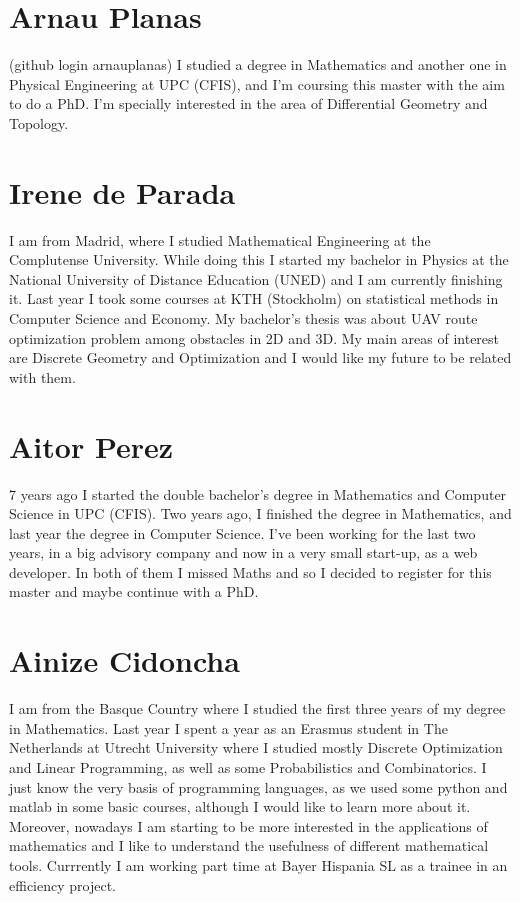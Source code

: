 \documentclass[11pt]{amsart}
\begin{document}
\section*{Arnau Planas}
(github login arnauplanas) I studied a degree in Mathematics and another one in Physical Engineering at UPC (CFIS), 
and I'm coursing this master with the aim to do a PhD. 
I'm specially interested in the area of Differential Geometry and Topology.
\medskip

\section*{Irene de Parada}

I am from Madrid, where I studied Mathematical Engineering at the Complutense University. While doing this I started my bachelor in Physics  at the National University of Distance Education (UNED) and I am currently finishing it. Last year I took some courses at KTH (Stockholm) on statistical methods in Computer Science and Economy. My  bachelor's thesis was about UAV route optimization problem  among obstacles in 2D and 3D. My main areas of interest are Discrete Geometry and Optimization and I would like my future to be related with them.

\section*{Aitor Perez}
7 years ago I started the double bachelor's degree in Mathematics and Computer Science in UPC (CFIS). Two years ago, I finished the degree in Mathematics, and last year the degree in Computer Science. I've been working for the last two years, in a big advisory company and now in a very small start-up, as a web developer. In both of them I missed Maths and so I decided to register for this master and maybe continue with a PhD.

\section*{Ainize Cidoncha}
I am from the Basque Country where I studied the first three years of my degree in Mathematics. Last year I spent a year as an Erasmus student in The Netherlands at Utrecht University where I studied mostly Discrete Optimization and Linear Programming, as well as some Probabilistics and Combinatorics.
I just know the very basis of programming languages, as we used some python and matlab in some basic courses, although I would like to learn more about it. Moreover, nowadays I am starting to be more interested in the applications of mathematics and I like to understand the usefulness of different mathematical tools. 
Currrently I am working part time at Bayer Hispania SL as a trainee in an efficiency project.
\end{document}
